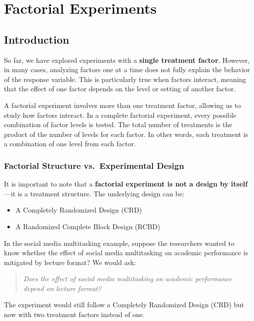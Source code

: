 \documentclass[
  letterpaper,
]{book}
\providecommand{\tightlist}{%
  \setlength{\itemsep}{0pt}\setlength{\parskip}{0pt}}\usepackage{longtable,booktabs,array}
\begin{document}
\part{Factorial Experiments}

\chapter{Introduction}\label{introduction-2}

So far, we have explored experiments with a \textbf{single treatment
factor}. However, in many cases, analyzing factors one at a time does
not fully explain the behavior of the response variable. This is
particularly true when factors interact, meaning that the effect of one
factor depends on the level or setting of another factor.

A factorial experiment involves more than one treatment factor, allowing
us to study how factors interact. In a complete factorial experiment,
every possible combination of factor levels is tested. The total number
of treatments is the product of the number of levels for each factor. In
other words, each treatment is a combination of one level from each
factor.

\section{Factorial Structure vs.~Experimental
Design}\label{factorial-structure-vs.-experimental-design}

It is important to note that a \textbf{factorial experiment is not a
design by itself}---it is a treatment structure. The underlying design
can be:

\begin{itemize}
\tightlist
\item
  A Completely Randomized Design (CRD)
\item
  A Randomized Complete Block Design (RCBD)
\end{itemize}

In the social media multitasking example, suppose the researchers wanted
to know whether the effect of social media multitasking on academic
performance is mitigated by lecture format? We would ask:

\begin{quote}
\emph{Does the effect of social media multitasking on academic
performance depend on lecture format?}
\end{quote}

The experiment would still follow a Completely Randomized Design (CRD)
but now with two treatment factors instead of one.
\end{document}
